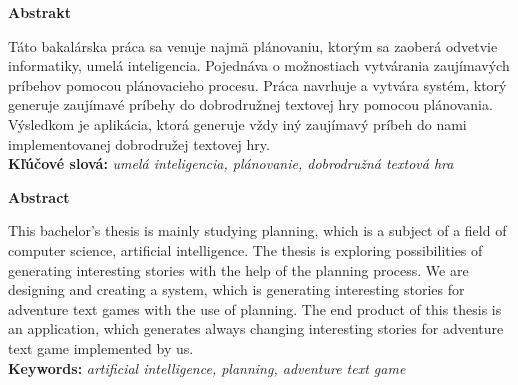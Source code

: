 {\noindent\large\bf Abstrakt}

\vspace{1.8cm}

Táto bakalárska práca sa venuje najmä plánovaniu, ktorým sa zaoberá odvetvie informatiky, umelá inteligencia. Pojednáva o možnostiach vytvárania zaujímavých príbehov pomocou plánovacieho procesu. Práca navrhuje a vytvára systém, ktorý generuje zaujímavé príbehy do dobrodružnej textovej hry pomocou plánovania. Výsledkom je aplikácia, ktorá generuje vždy iný zaujímavý príbeh do nami implementovanej dobrodružej textovej hry. 
\\

{\parindent0pt \textbf{Kľúčové slová:} \emph{umelá inteligencia, plánovanie, dobrodružná textová hra}} 

\newpage
 {\noindent\large\bf Abstract}
  \vspace{1.8cm}
 

This bachelor's thesis is mainly studying planning, which is a subject of a field of computer science, artificial intelligence. The thesis is exploring possibilities of generating interesting stories with the help of the planning process. We are designing and creating a system, which is generating interesting stories for adventure text games with the use of planning. The end product of this thesis is an application, which generates always changing interesting stories for adventure text game implemented by us.
\\

{\parindent0pt \textbf{Keywords:} \emph{artificial intelligence, planning, adventure text game}}


\newpage
